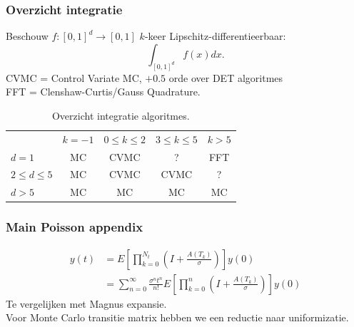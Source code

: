 \documentclass[18pt,aspectratio=149]{beamer}
\begin{document}
\begin{frame}
    \frametitle{Overzicht integratie}
    Beschouw $f:[0,1]^d \rightarrow [0,1]$ $k$-keer Lipschitz-differentieerbaar:
    \begin{equation}
        \int_{[0,1]^d} f(x) dx  .
    \end{equation}
    CVMC = Control Variate MC, $+0.5$ orde over DET algoritmes \\
    FFT = Clenshaw-Curtis/Gauss Quadrature.
    \begin{table}
        \centering
        \begin{tabular}{lcccc}
                            & $k=-1$ & $0 \le k \le 2$ & $3 \le k \le 5$ & $k>5$ \\
            $d=1$           & MC     & CVMC            & ?               & FFT   \\
            $2 \le d \le 5$ & MC     & CVMC            & CVMC            & ?     \\
            $d>5$           & MC     & MC              & MC              & MC    \\
        \end{tabular}
        \caption{Overzicht integratie algoritmes.}
    \end{table}
\end{frame}

\begin{frame}
    \frametitle{Main Poisson appendix}
    \begin{align}
        y(t) & = E \left[\prod_{k=0}^{N_{t}}\left( I + \frac{A(T_{k})}{\sigma} \right)    \right] y(0)                                             \\
             & = \sum_{n=0}^{\infty}\frac{\sigma^{n} t ^{n}}{n!} E \left[\prod_{k=0}^{n}\left( I + \frac{A(T_{k})}{\sigma} \right)    \right] y(0)
    \end{align}
    Te vergelijken met Magnus expansie.\\
    Voor Monte Carlo transitie matrix hebben we een reductie naar uniformizatie.

\end{frame}
\end{document}
